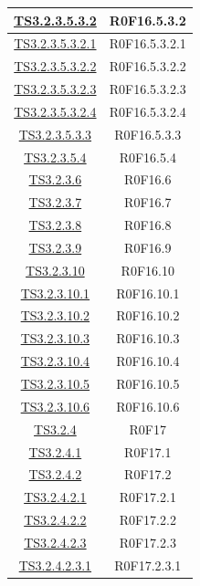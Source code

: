 \documentclass[../PianoDiQualifica.tex]{subfiles}
\begin{document}
\begin{longtable}{|c|c|}
		\hline
		\hyperlink{TS3.2.3.5.3.2}{TS3.2.3.5.3.2} & R0F16.5.3.2   \\
		\hline
		\hyperlink{TS3.2.3.5.3.2.1}{TS3.2.3.5.3.2.1} & R0F16.5.3.2.1   \\
		\hline
		\hyperlink{TS3.2.3.5.3.2.2}{TS3.2.3.5.3.2.2} & R0F16.5.3.2.2   \\
		\hline
		\hyperlink{TS3.2.3.5.3.2.3}{TS3.2.3.5.3.2.3} & R0F16.5.3.2.3   \\
		\hline
		\hyperlink{TS3.2.3.5.3.2.4}{TS3.2.3.5.3.2.4} & R0F16.5.3.2.4   \\
		\hline
		\hyperlink{TS3.2.3.5.3.3}{TS3.2.3.5.3.3} & R0F16.5.3.3   \\
		\hline
		\hyperlink{TS3.2.3.5.4}{TS3.2.3.5.4} & R0F16.5.4   \\
		\hline
		\hyperlink{TS3.2.3.6}{TS3.2.3.6} & R0F16.6   \\
		\hline
		\hyperlink{TS3.2.3.7}{TS3.2.3.7} & R0F16.7   \\
		\hline
		\hyperlink{TS3.2.3.8}{TS3.2.3.8} & R0F16.8   \\
		\hline
		\hyperlink{TS3.2.3.9}{TS3.2.3.9} & R0F16.9   \\
		\hline
		\hyperlink{TS3.2.3.10}{TS3.2.3.10} & R0F16.10   \\
		\hline
		\hyperlink{TS3.2.3.10.1}{TS3.2.3.10.1} & R0F16.10.1   \\
		\hline
		\hyperlink{TS3.2.3.10.2}{TS3.2.3.10.2} & R0F16.10.2   \\
		\hline
		\hyperlink{TS3.2.3.10.3}{TS3.2.3.10.3} & R0F16.10.3   \\
		\hline
		\hyperlink{TS3.2.3.10.4}{TS3.2.3.10.4} & R0F16.10.4   \\
		\hline
		\hyperlink{TS3.2.3.10.5}{TS3.2.3.10.5} & R0F16.10.5   \\
		\hline
		\hyperlink{TS3.2.3.10.6}{TS3.2.3.10.6} & R0F16.10.6   \\
		\hline
		\hyperlink{TS3.2.4}{TS3.2.4} & R0F17   \\
		\hline
		\hyperlink{TS3.2.4.1}{TS3.2.4.1} & R0F17.1   \\
		\hline
		\hyperlink{TS3.2.4.2}{TS3.2.4.2} & R0F17.2   \\
		\hline
		\hyperlink{TS3.2.4.2.1}{TS3.2.4.2.1} & R0F17.2.1   \\
		\hline
		\hyperlink{TS3.2.4.2.2}{TS3.2.4.2.2} & R0F17.2.2   \\
		\hline
		\hyperlink{TS3.2.4.2.3}{TS3.2.4.2.3} & R0F17.2.3   \\
		\hline
		\hyperlink{TS3.2.4.2.3.1}{TS3.2.4.2.3.1} & R0F17.2.3.1   \\

\end{longtable}
\end{document}
